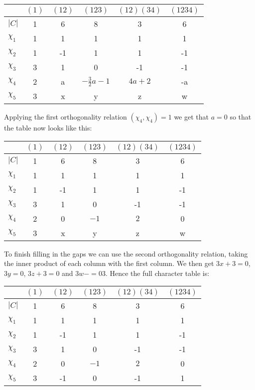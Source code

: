 \documentclass[11pt]{article} \usepackage{amssymb}
\begin{document}
\begin{table}[h]
\begin{center}
{\small
\begin{tabular}{ l | c | c | c | c | c }
  & $(1)$ & $(12)$ & $(123)$ & $(12)(34)$ & $(1234)$ \\
\hline
$|C|$ & 1 & 6 & 8 & 3 & 6\\
\hline
$\chi_1$ & 1 & 1 & 1 & 1 & 1\\
$\chi_2$ & 1 & -1 & 1 & 1 & -1\\
$\chi_3$ & 3 & 1 & 0 & -1 & -1\\
$\chi_4$ & 2 & a & $-\frac{3}{2}a-1$ & $4a+2$ & -a\\
$\chi_5$ & 3 & x & y & z & w\\
\end{tabular}
}
\end{center}
\end{table}

\pagebreak
Applying the first orthogonality relation $(\chi_4,\chi_4)=1$ we get
that $a=0$ so that the table now looks like this:

\begin{table}[h]
\begin{center}
{\small
\begin{tabular}{ l | c | c | c | c | c }
  & $(1)$ & $(12)$ & $(123)$ & $(12)(34)$ & $(1234)$ \\
\hline
$|C|$ & 1 & 6 & 8 & 3 & 6\\
\hline
$\chi_1$ & 1 & 1 & 1 & 1 & 1\\
$\chi_2$ & 1 & -1 & 1 & 1 & -1\\
$\chi_3$ & 3 & 1 & 0 & -1 & -1\\
$\chi_4$ & 2 & 0 & $-1$ & $2$ & 0\\
$\chi_5$ & 3 & x & y & z & w\\
\end{tabular}
}
\end{center}
\end{table}

To finish filling in the gaps we can use the second orthogonality
relation, taking the inner product of each column with the first
column. We then get $3x+3=0$, $3y=0$, $3z+3=0$ and $3w-=03$. Hence the
full character table is:


\begin{table}[h]
\begin{center}
{\small
\begin{tabular}{ l | c | c | c | c | c }
  & $(1)$ & $(12)$ & $(123)$ & $(12)(34)$ & $(1234)$ \\
\hline
$|C|$ & 1 & 6 & 8 & 3 & 6\\
\hline
$\chi_1$ & 1 & 1 & 1 & 1 & 1\\
$\chi_2$ & 1 & -1 & 1 & 1 & -1\\
$\chi_3$ & 3 & 1 & 0 & -1 & -1\\
$\chi_4$ & 2 & 0 & $-1$ & $2$ & 0\\
$\chi_5$ & 3 & -1 & 0 & -1 & 1\\
\end{tabular}
}
\end{center}
\end{table}
\end{document}
